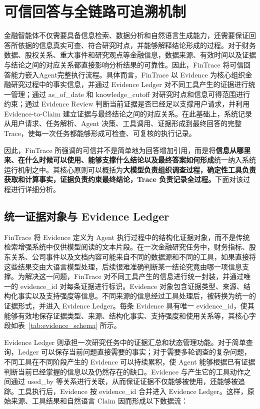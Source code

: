 \section{可信回答与全链路可追溯机制}
\label{sec:traceability}

金融智能体不仅需要具备信息检索、数据分析和自然语言生成能力，还需要保证回答所依据的信息真实可查、符合研究时点，并能够解释结论形成的过程。对于财务数据、股权关系、重大事件和研究观点等金融信息，数据来源、有效时间以及证据与结论之间的对应关系都直接影响分析结果的可靠性。因此，FinTrace 将可信回答能力嵌入Agent完整执行流程。具体而言，FinTrace 以 Evidence 为核心组织金融研究过程中的事实信息，并通过 Evidence Ledger 对不同工具产生的证据进行统一管理；通过 as\_of\_date 和 knowledge\_cutoff 对研究时点和信息可得范围进行约束；通过 Evidence Review 判断当前证据是否已经足以支撑用户请求，并利用 Evidence-to-Claim 建立证据与最终结论之间的对应关系。在此基础上，系统记录从用户请求、任务解析、Agent 决策、工具调用、证据形成到最终回答的完整 Trace，使每一次任务都能够形成可检查、可复核的执行记录。

因此，FinTrace 所强调的可信并不是简单地为回答增加引用，而是将\textbf{信息从哪里来、在什么时候可以使用、能够支撑什么结论以及最终答案如何形成}统一纳入系统运行机制之中。其核心原则可以概括为\textbf{大模型负责组织调查过程，确定性工具负责获取和计算事实，证据负责约束最终结论，Trace 负责记录全过程。}下面对该过程进行详细分析。

\subsection{统一证据对象与 Evidence Ledger}

FinTrace 将 Evidence 定义为 Agent 执行过程中的结构化证据对象，而不是传统检索增强系统中仅供模型阅读的文本片段。在一次金融研究任务中，财务指标、股东关系、公司事件以及文档内容可能来自不同的数据源和不同的工具，如果直接将这些结果交由大语言模型处理，后续很难准确判断某一结论究竟由哪一项信息支撑。为解决这一问题，FinTrace 对不同工具产生的信息进行统一封装，并通过唯一的 evidence\_id 对每条证据进行标识。Evidence 对象包含证据类型、来源、结构化事实以及支持强度等信息。不同来源的信息经过工具处理后，被转换为统一的证据形式，并进入 Evidence Ledger。每条 Evidence 具有唯一 evidence\_id，使其能够有效地保存证据类型、来源、结构化事实、支持强度和使用关系等，其核心字段如表~\ref{tab:evidence_schema} 所示。

Evidence Ledger 则承担一次研究任务中的证据汇总和状态管理功能。对于简单查询，Ledger 可以保存当前问题直接需要的事实；对于需要多轮调查的复杂问题，不同工具在不同阶段产生的 Evidence 可以持续累积，使 Agent 能够根据已有证据判断当前已经掌握的信息以及仍然存在的缺口。Evidence 与产生它的工具动作之间通过 used\_by 等关系进行关联，从而保证证据不仅能够被使用，还能够被追踪。工具执行后，Evidence 按 evidence\_id 合并进入 Evidence Ledger。这样，原始来源、工具结果和自然语言 Claim 因而形成以下数据流：

